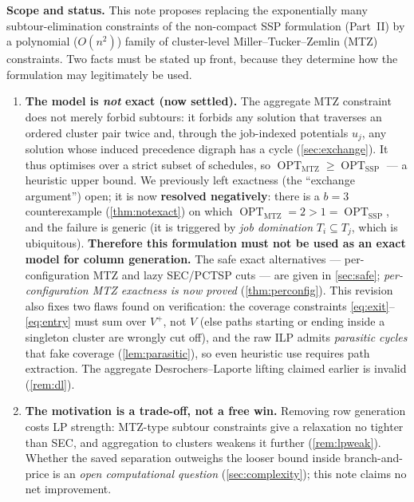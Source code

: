 \documentclass[11pt,a4paper]{article}
\theoremstyle{plain}
\theoremstyle{definition}
\DeclareMathOperator{\OPT}{OPT}
\newcommand{\OMTZ}{\OPT_{\mathrm{MTZ}}}
\newcommand{\OSSP}{\OPT_{\mathrm{SSP}}}
\begin{document}
\begin{mdframed}[backgroundcolor=lightblue,linecolor=navyblue,linewidth=1pt,
  innerleftmargin=14pt,innerrightmargin=14pt,innertopmargin=8pt,innerbottommargin=8pt]
\small\textbf{Scope and status.}
This note proposes replacing the exponentially many subtour-elimination constraints of
the non-compact SSP formulation (Part~II) by a polynomial ($O(n^2)$) family of
cluster-level Miller--Tucker--Zemlin (MTZ) constraints. Two facts must be stated up front,
because they determine how the formulation may legitimately be used.
\begin{enumerate}[label=\textbf{(\arabic*)}]
\item \textbf{The model is \emph{not} exact (now settled).} The aggregate MTZ constraint does
not merely forbid subtours: it forbids any solution that traverses an ordered cluster pair
twice and, through the job-indexed potentials $u_j$, any solution whose induced precedence
digraph has a cycle (\cref{sec:exchange}). It thus optimises over a strict subset of
schedules, so $\OMTZ\ge\OSSP$ --- a heuristic upper bound. We previously left exactness
(the ``exchange argument'') open; it is now \textbf{resolved negatively}: there is a $b=3$
counterexample (\cref{thm:notexact}) on which $\OMTZ=2>1=\OSSP$, and the failure is generic
(it is triggered by \emph{job domination} $T_i\subseteq T_j$, which is ubiquitous).
\textbf{Therefore this formulation must not be used as an exact model for column generation.}
The safe exact alternatives --- per-configuration MTZ and lazy SEC/PCTSP cuts --- are given
in \cref{sec:safe}; \emph{per-configuration MTZ exactness is now proved}
(\cref{thm:perconfig}). This revision also fixes two flaws found on verification:
the coverage constraints \eqref{eq:exit}--\eqref{eq:entry} must sum over $V^{+}$, not $V$
(else paths starting or ending inside a singleton cluster are wrongly cut off), and the raw
ILP admits \emph{parasitic cycles} that fake coverage (\cref{lem:parasitic}), so even
heuristic use requires path extraction. The aggregate Desrochers--Laporte lifting claimed
earlier is invalid (\cref{rem:dl}).
\item \textbf{The motivation is a trade-off, not a free win.} Removing row generation costs
LP strength: MTZ-type subtour constraints give a relaxation no tighter than SEC, and
aggregation to clusters weakens it further (\cref{rem:lpweak}). Whether the saved separation
outweighs the looser bound inside branch-and-price is an \emph{open computational question}
(\cref{sec:complexity}); this note claims no net improvement.
\end{enumerate}
\end{mdframed}
\end{document}
